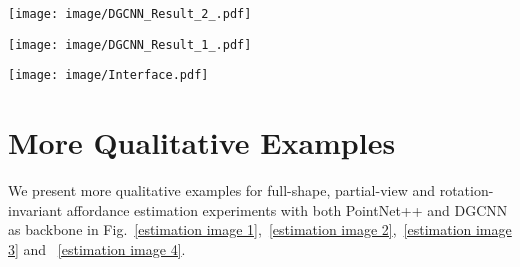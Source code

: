 \documentclass[final]{cvpr}
\begin{document}
\begin{figure*}[t]
   \begin{center}
      \texttt{[image: image/DGCNN\_Result\_2\_.pdf]}
   \end{center}
   \vspace{-0.5cm}
   \caption{Qualitative results for affordance estimation from DGCNN(1/2). The top row shows the ground truth. The second row shows the full-shape estimated results, the third row shows the partial-view estimated result, the fourth and the bottom row show the $z/z$ and $SO(3)/SO(3)$ rotation-invariant estimated results, respectively. All results come from DGCNN. The top words indicate the semantic category of each column and the bottom words indicate the affordance category. The greener the color of the points, the higher the confidence about specific affordance types. \textit{Wrap.} is the abbreviation of \textit{Wrap-Grasp.}}
   \label{estimation image 3}
\end{figure*}

\begin{figure*}[t]
   \begin{center}
      \texttt{[image: image/DGCNN\_Result\_1\_.pdf]}
   \end{center}
   \caption{Qualitative results for affordance estimation from DGCNN(2/2). The top row shows the ground truth. The second row shows the full-shape estimated results, the third row shows the partial-view estimated result, the fourth and the bottom row show the $z/z$ and $SO(3)/SO(3)$ rotation-invariant estimated results, respectively. All results come from DGCNN. The top words indicate the semantic category of each column and the bottom words indicate the affordance category. The greener the color of the points, the higher the confidence about specific affordance types. \textit{Wrap.} is the abbreviation of \textit{Wrap-Grasp.}}
   \label{estimation image 4}
\end{figure*}

\begin{figure*}[t]
   \begin{center}
      \texttt{[image: image/Interface.pdf]}
   \end{center}
   \caption{The annotation interface of our web-based annotation tool. We show the GUI and main component of the annotation interface.}
   \label{annotation interface}
\end{figure*}

\section{More Qualitative Examples} \label{qualitative examples}
We present more qualitative examples for full-shape, partial-view and rotation-invariant affordance estimation experiments with both PointNet++ and DGCNN as backbone in Fig.~\ref{estimation image 1},~\ref{estimation image 2},~\ref{estimation image 3} and ~\ref{estimation image 4}.
\end{document}
